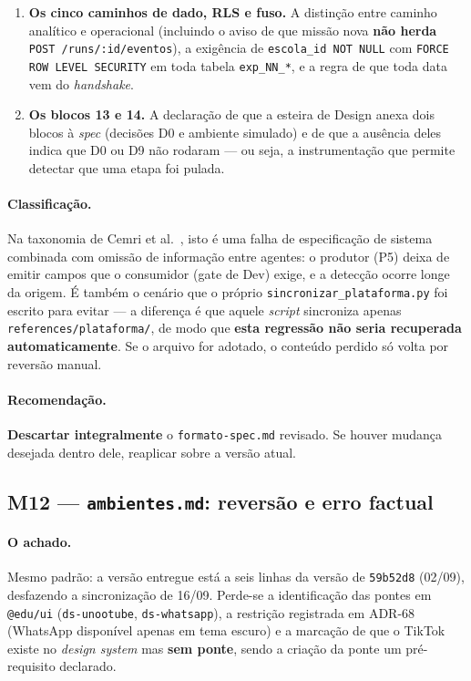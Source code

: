 \documentclass[11pt,a4paper]{article}
\newcommand{\Vermelho}[1]{\textcolor{vermelho}{\textbf{#1}}}
\newcommand{\cod}[1]{\texttt{\small #1}}
\begin{document}
\begin{enumerate}[leftmargin=*,itemsep=3pt]
  \item \textbf{Os cinco caminhos de dado, RLS e fuso.} A distinção entre caminho analítico e operacional
  (incluindo o aviso de que missão nova \textbf{não herda} \cod{POST /runs/:id/eventos}), a exigência de
  \cod{escola\_id NOT NULL} com \cod{FORCE ROW LEVEL SECURITY} em toda tabela \cod{exp\_NN\_*}, e a regra de
  que toda data vem do \textit{handshake}.

  \item \textbf{Os blocos 13 e 14.} A declaração de que a esteira de Design anexa dois blocos à \textit{spec}
  (decisões D0 e ambiente simulado) e de que a ausência deles indica que D0 ou D9 não rodaram --- ou seja,
  a instrumentação que permite detectar que uma etapa foi pulada.
\end{enumerate}

\paragraph{Classificação.} Na taxonomia de Cemri et al.~\cite{cemri2025}, isto é uma falha de especificação
de sistema combinada com omissão de informação entre agentes: o produtor (P5) deixa de emitir campos que o
consumidor (gate de Dev) exige, e a detecção ocorre longe da origem. É também o cenário que o próprio
\cod{sincronizar\_plataforma.py} foi escrito para evitar --- a diferença é que aquele \textit{script}
sincroniza apenas \cod{references/plataforma/}, de modo que \textbf{esta regressão não seria recuperada
automaticamente}. Se o arquivo for adotado, o conteúdo perdido só volta por reversão manual.

\paragraph{Recomendação.} \Vermelho{Descartar integralmente} o \cod{formato-spec.md} revisado. Se houver
mudança desejada dentro dele, reaplicar sobre a versão atual.

\subsection{M12 --- \cod{ambientes.md}: reversão e erro factual}

\paragraph{O achado.} Mesmo padrão: a versão entregue está a seis linhas da versão de \cod{59b52d8}
(02/09), desfazendo a sincronização de 16/09. Perde-se a identificação das pontes em \cod{@edu/ui}
(\cod{ds-unootube}, \cod{ds-whatsapp}), a restrição registrada em ADR-68 (WhatsApp disponível apenas em tema
escuro) e a marcação de que o TikTok existe no \textit{design system} mas \textbf{sem ponte}, sendo a
criação da ponte um pré-requisito declarado.
\end{document}
